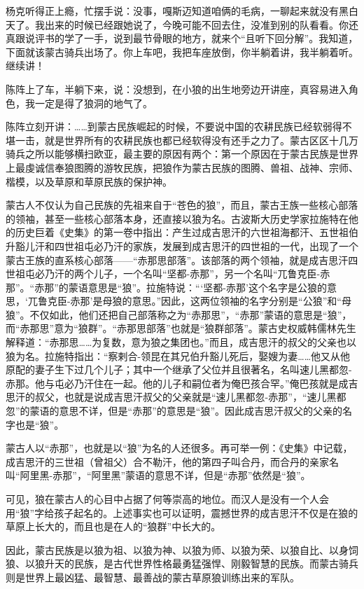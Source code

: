 \par 杨克听得正上瘾，忙摆手说：没事，嘎斯迈知道咱俩的毛病，一聊起来就没有黑白天了。我出来的时候已经跟她说了，今晚可能不回去住，没准到别的队看看。你还真跟说评书的学了一手，说到最节骨眼的地方，就来个“且听下回分解”。我知道，下面就该蒙古骑兵出场了。你上车吧，我把车座放倒，你半躺着讲，我半躺着听。继续讲！
\par 陈阵上了车，半躺下来，说：没想到，在小狼的出生地旁边开讲座，真容易进入角色，我一定是得了狼洞的地气了。
\par 陈阵立刻开讲：……到蒙古民族崛起的时候，不要说中国的农耕民族已经软弱得不堪一击，就是世界所有的农耕民族也都已经软得没有还手之力了。蒙古区区十几万骑兵之所以能够横扫欧亚，最主要的原因有两个：第一个原因在于蒙古民族是世界上最虔诚信奉狼图腾的游牧民族，把狼作为蒙古民族的图腾、兽祖、战神、宗师、楷模，以及草原和草原民族的保护神。
\par 蒙古人不仅认为自己民族的先祖来自于“苍色的狼”，而且，蒙古王族一些核心部落的领袖，甚至一些核心部落本身，还直接以狼为名。古波斯大历史学家拉施特在他的历史巨着《史集》的第一卷中指出：产生过成吉思汗的六世祖海都汗、五世祖伯升豁儿汗和四世祖屯必乃汗的家族，发展到成吉思汗的四世祖的一代，出现了一个蒙古王族的直系核心部落——“赤那思部落”。该部落的两个领袖，就是成吉思汗四世祖屯必乃汗的两个儿子，一个名叫“坚都-赤那”，另一个名叫“兀鲁克臣-赤那”。“赤那”的蒙语意思是“狼”。拉施特说：“‘坚都-赤那’这个名字是公狼的意思，‘兀鲁克臣-赤那’是母狼的意思。”因此，这两位领袖的名字分别是“公狼”和“母狼”。不仅如此，他们还把自己部落称之为“赤那思”，“赤那”蒙语的意思是“狼”，而“赤那思”意为“狼群”。“赤那思部落”也就是“狼群部落”。蒙古史权威韩儒林先生解释道：“赤那思……为复数，意为狼之集团也。”而且，成吉思汗的叔父的父亲也以狼为名。拉施特指出：“察剌合-领昆在其兄伯升豁儿死后，娶嫂为妻……他又从他原配的妻子生下过几个儿子；其中一个继承了父位并且很著名，名叫速儿黑都忽-赤那。他与屯必乃汗住在一起。他的儿子和嗣位者为俺巴孩合罕。”俺巴孩就是成吉思汗的叔父，也就是说成吉思汗叔父的父亲就是“速儿黑都忽-赤那”，“速儿黑都忽”的蒙语的意思不详，但是“赤那”的意思是“狼”。因此成吉思汗叔父的父亲的名字也是“狼”。
\par 蒙古人以“赤那”，也就是以“狼”为名的人还很多。再可举一例：《史集》中记载，成吉思汗的三世祖（曾祖父）合不勒汗，他的第四子叫合丹，而合丹的亲家名叫“阿里黑-赤那”，“阿里黑”蒙语的意思不详，但是“赤那”依然是“狼”。
\par 可见，狼在蒙古人的心目中占据了何等崇高的地位。而汉人是没有一个人会用“狼”字给孩子起名的。上述事实也可以证明，震撼世界的成吉思汗不仅是在狼的草原上长大的，而且也是在人的“狼群”中长大的。
\par 因此，蒙古民族是以狼为祖、以狼为神、以狼为师、以狼为荣、以狼自比、以身饲狼、以狼升天的民族，是古代世界性格最勇猛强悍、刚毅智慧的民族。而蒙古骑兵则是世界上最凶猛、最智慧、最善战的蒙古草原狼训练出来的军队。

